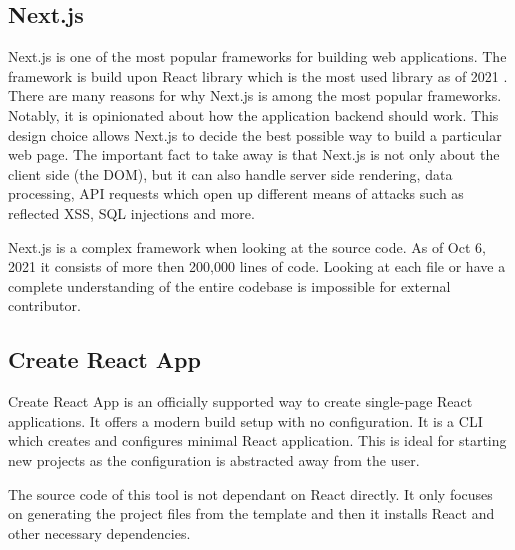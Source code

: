 \subsection{Next.js}
\label{intro-nextjs}

Next.js is one of the most popular frameworks for building web applications. The framework is build
upon React library which is the most used library as of 2021 \cite{react_most_used_2021}. There are
many reasons for why Next.js is among the most popular frameworks. Notably, it is opinionated about
how the application backend should work. This design choice allows Next.js to decide the best
possible way to build a particular web page. The important fact to take away is that Next.js is not
only about the client side (the DOM), but it can also handle server side rendering, data processing,
API requests which open up different means of attacks such as reflected XSS, SQL injections and
more.

Next.js is a complex framework when looking at the source code. As of Oct 6, 2021 it consists of
more then 200,000 lines of code. Looking at each file or have a complete understanding of the
entire codebase is impossible for external contributor.

\subsection{Create React App}
\label{intro-cra}

Create React App is an officially supported way to create single-page React applications. It offers
a modern build setup with no configuration. It is a CLI which creates and configures minimal React
application. This is ideal for starting new projects as the configuration is abstracted away from
the user.

The source code of this tool is not dependant on React directly. It only focuses on generating the
project files from the template and then it installs React and other necessary dependencies.

